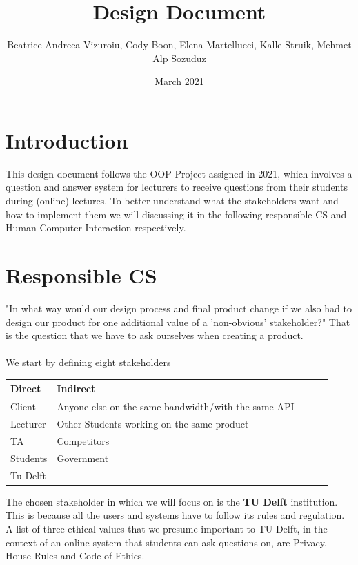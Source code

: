\documentclass{article}
\title{Design Document}
\author{Beatrice-Andreea Vizuroiu, Cody Boon, Elena Martellucci, Kalle Struik, Mehmet Alp Sozuduz }
\date{March 2021}
\begin{document}
    \maketitle

    \section{Introduction}
    This design document follows the OOP Project assigned in 2021, which involves a question and answer system for lecturers to receive questions from their students during (online) lectures. To better understand what the stakeholders want and how to implement them we will discussing it in the following responsible CS and Human Computer Interaction respectively.


    \section{Responsible CS}
    "In what way would our design process and final product change if we also had to design our product for one additional value of a 'non-obvious' stakeholder?" That is the question that we have to ask ourselves when creating a product.\\
    \\We start by defining eight stakeholders\\
    \begin{center}
        \begin{tabular}{ | l | l | l | l | l |}
            \hline
            Direct    & Indirect \\ \hline \hline
            Client  & Anyone else on the same bandwidth/with the same API  \\ \hline
            Lecturer  & Other Students working on the same product  \\ \hline
            TA  &  Competitors  \\ \hline
            Students  & Government  \\ \hline
            Tu Delft  &   \\ \hline
        \end{tabular}
    \end{center}

    The chosen stakeholder in which we will focus on is the \textbf{TU Delft} institution. This is because all the users and systems have to follow its rules and regulation.\\

    A list of three ethical values that we presume important to TU Delft, in the context of an online system that students can ask questions on, are Privacy, House Rules and Code of Ethics.\\
\end{document}
